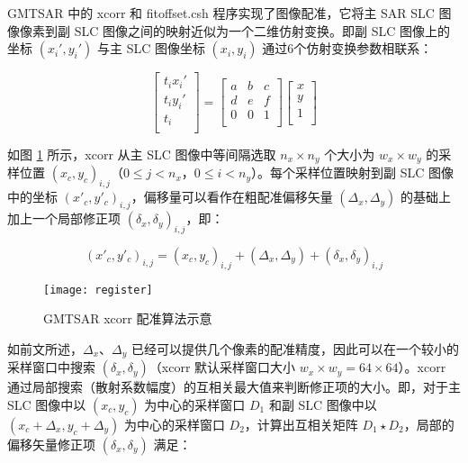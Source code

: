 GMTSAR 中的 xcorr 和 fitoffset.csh 程序实现了图像配准，它将主 SAR SLC 图像像素到副 SLC 图像之间的映射近似为一个二维仿射变换。即副 SLC 图像上的坐标 $(x_i', y_i')$ 与主 SLC 图像坐标 $(x_i, y_i)$ 通过6个仿射变换参数相联系：

\begin{equation}
\begin{bmatrix}
  t_i x_i' \\
  t_i y_i' \\
  t_i \\
\end{bmatrix}
= \begin{bmatrix}
       a & b & c \\
       d & e & f \\
       0 & 0 & 1 \\
\end{bmatrix}
\begin{bmatrix}
  x \\
  y \\
  1 \\
\end{bmatrix}
\end{equation}

如图 \ref{fig:register} 所示，xcorr 从主 SLC 图像中等间隔选取 $n_x \times n_y $ 个大小为 $w_x \times w_y$ 的采样位置 $(x_c, y_c)_{i,j}$（$0 \leq j < n_x$，$0 \leq i < n_y$）。每个采样位置映射到副 SLC 图像中的坐标 $(x'_c, y'_c)_{i,j}$，偏移量可以看作在粗配准偏移矢量 $(\Delta_x, \Delta_y)$ 的基础上加上一个局部修正项 $(\delta_x, \delta_y)_{i,j}$，即：

\begin{equation}
    (x'_c, y'_c)_{i,j} = (x_c, y_c)_{i,j} + (\Delta_x, \Delta_y) + (\delta_x, \delta_y)_{i,j}
\end{equation}

\begin{figure}[htbp]
\centering
\texttt{[image: register]}
\caption{GMTSAR xcorr 配准算法示意} \label{fig:register}
\end{figure}

如前文所述，$\Delta_x$、$\Delta_y$ 已经可以提供几个像素的配准精度，因此可以在一个较小的采样窗口中搜索 $(\delta_x, \delta_y)$（xcorr 默认采样窗口大小 $w_x \times w_y = 64 \times 64$）。xcorr 通过局部搜索（散射系数幅度）的互相关最大值来判断修正项的大小。即，对于主 SLC 图像中以 $(x_c, y_c)$ 为中心的采样窗口 $D_1$ 和副 SLC 图像中以 $(x_c + \Delta_x, y_c + \Delta_y)$ 为中心的采样窗口 $D_2$，计算出互相关矩阵 $D_1 \star D_2$，局部的偏移矢量修正项 $(\delta_x, \delta_y)$ 满足：

